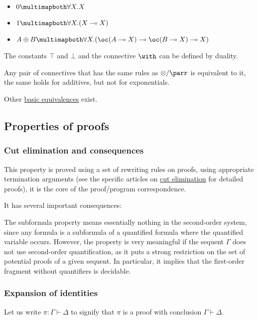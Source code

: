 \begin{itemize}
\tightlist
\item
  \(\zero \linequiv \forall X.X\)
\item
  \(\one \linequiv \forall X.(X \limp X)\)
\item
  \(A \plus B \linequiv \forall X.(\oc(A \limp X) \limp \oc(B \limp X) \limp X)\)
\end{itemize}

The constants \(\top\) and \(\bot\) and the connective \(\with\) can be
defined by duality.

Any pair of connectives that has the same rules as \(\tens/\parr\) is
equivalent to it, the same holds for additives, but not for
exponentials.

Other \href{List_of_equivalences}{basic equivalences} exist.

\subsection{Properties of proofs}\label{properties-of-proofs}

\subsubsection{Cut elimination and
consequences}\label{cut-elimination-and-consequences}

This property is proved using a set of rewriting rules on proofs, using
appropriate termination arguments (see the specific articles on
\href{cut_elimination}{cut elimination} for detailed proofs), it is the
core of the proof/program correspondence.

It has several important consequences:

The subformula property means essentially nothing in the second-order
system, since any formula is a subformula of a quantified formula where
the quantified variable occurs. However, the property is very meaningful
if the sequent \(\Gamma\) does not use second-order quantification, as
it puts a strong restriction on the set of potential proofs of a given
sequent. In particular, it implies that the first-order fragment without
quantifiers is decidable.

\subsubsection{Expansion of identities}\label{expansion-of-identities}

Let us write \(\pi:\Gamma\vdash\Delta\) to signify that \(\pi\) is a
proof with conclusion \(\Gamma\vdash\Delta\).

